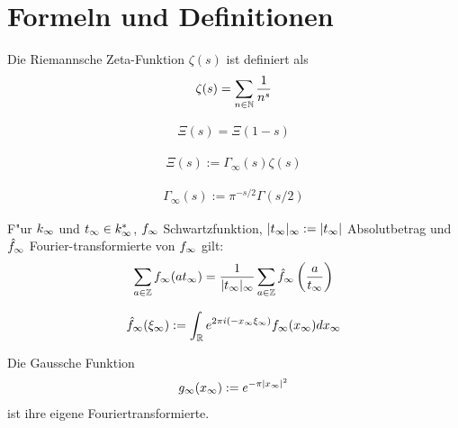 \section{Formeln und Definitionen}
\label{sec:riemann2}

\begin{defi}
	\label{def:zeta}
	Die Riemannsche Zeta-Funktion $\zeta(s)$  ist definiert als
	\begin{align}
		\zeta (s) = \sum_{n\in \mathbb{N}} \frac{1}{n^s}
	\end{align}
\end{defi}

\begin{satz}
	\label{form:funktionalgleichung}
	\begin{align}
		 \Xi(s) = \Xi(1-s)
	\end{align}
\end{satz}


\begin{defi}
	\label{def:xi}
	\begin{align}
		\Xi(s) := \Gamma_\infty(s) \zeta(s)
	\end{align}
\end{defi}

\begin{defi}
	\label{def:gamma_infty}
	\begin{align}
		\Gamma_\infty(s) := \pi^{-s/2} \Gamma(s/2)
	\end{align}
\end{defi}

\begin{satz}
	\label{satz:poisson}
	F"ur $k_\infty$ und $t_\infty \in k_\infty^*$, $f_\infty$ Schwartzfunktion, $|t_\infty|_\infty := |t_\infty|$ Absolutbetrag und $\hat{f}_\infty$ Fourier-transformierte von $f_\infty$ gilt:
	\begin{align}
		\sum_{a \in \mathbb{Z}} f_\infty (a t_\infty) = \frac{1}{|t_\infty|_\infty} \sum_{a \in \mathbb{Z}} \hat{f}_\infty \left( \frac{a} {t_\infty} \right)
	\end{align}
\end{satz}

\begin{defi}[Fouriertransformation]
	\label{def:fourier}
	\begin{align}
		\hat{f}_\infty(\xi_\infty) := \int_{\mathbb{R}}{e^{ 2\pi i (-x_\infty\xi_\infty) }f_\infty(x_\infty)dx_\infty}
	\end{align}
\end{defi}

\begin{satz}
	Die Gaussche Funktion
	\begin{align}
		g_\infty(x_\infty) := e^{-\pi |x_\infty|^2}
	\end{align}
	ist ihre eigene Fouriertransformierte.
\end{satz}

